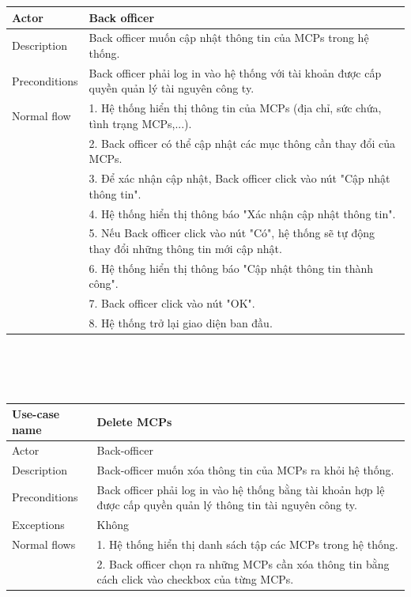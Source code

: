 \documentclass[a4paper]{article}
\begin{document}
\begin{enumerate}
\begin{enumerate}
\begin{tabular}{|p{3cm} | p{10cm}|}
         \hline
         Actor & Back officer \\
         \hline 
         Description & Back officer muốn cập nhật thông tin của MCPs trong hệ thống. \\
         \hline
         Preconditions & Back officer phải log in vào hệ thống với tài khoản được cấp quyền quản lý tài nguyên công ty.\\
         \hline
         Normal flow 
         &1. Hệ thống hiển thị thông tin của MCPs (địa chỉ, sức chứa, tình trạng MCPs,...). \\
         &2. Back officer có thể cập nhật các mục thông cần thay đổi của MCPs. \\
         &3. Để xác nhận cập nhật, Back officer click vào nút "Cập nhật thông tin". \\
         &4. Hệ thống hiển thị thông báo "Xác nhận cập nhật thông tin". \\ 
         &5. Nếu Back officer click vào nút "Có", hệ thống sẽ tự động thay đổi những thông tin mới cập nhật. \\
         &6. Hệ thống hiển thị thông báo "Cập nhật thông tin thành công". \\
         &7. Back officer click vào nút "OK". \\
         &8. Hệ thống trở lại giao diện ban đầu. \\
         \hline
    \end{tabular}
    \\ \\ \\
    \begin{tabular}{|p{3cm}|p{10cm}|}
         \hline
         Use-case name & \textbf{Delete MCPs} \\
         \hline
         Actor & Back-officer \\ 
         \hline
         Description & Back-officer muốn xóa thông tin của MCPs ra khỏi hệ thống. \\
         \hline
         Preconditions & Back officer phải log in vào hệ thống bằng tài khoản hợp lệ được cấp quyền quản lý thông tin tài nguyên công ty. \\
         \hline
         Exceptions & Không \\
         \hline
         Normal flows  
         &1. Hệ thống hiển thị danh sách tập các MCPs trong hệ thống. \\
         &2. Back officer chọn ra những MCPs cần xóa thông tin bằng cách click vào checkbox của từng MCPs. \\

\end{tabular}
\end{enumerate}
\end{enumerate}
\end{document}
